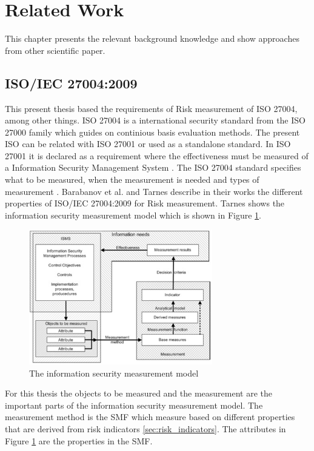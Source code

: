 \section{Related Work}
\label{sec:relWork}

This chapter presents the relevant background knowledge and show approaches from other scientific paper.

\subsection{ISO/IEC 27004:2009}

This present thesis based the requirements of Risk measurement of ISO 27004, among other things. ISO 27004 is a international security standard from the ISO 27000 \cite{DBLP:conf/euspn/MeriahR19} family which guides on continious basis evaluation methods. The present ISO can be related with ISO 27001 or used as a standalone standard. In ISO 27001 it is declared as a requirement where the effectiveness must be measured of a Information Security Management System \cite{barabanov2011information}. The ISO 27004 standard specifies what to be measured, when the measurement is needed and types of measurement \cite{lundholm2011design}. Barabanov et al. \cite{barabanov2011information} and Tarnes \cite{tarnes2012information} describe in their works the different properties of ISO/IEC 27004:2009 for Risk measurement. Tarnes shows the information security measurement model which is shown in Figure \ref{fig:is_measurement_model}.

\begin{figure}[h!]
  \centering
  \includegraphics[width=8cm]{pictures/is_measurement_model.jpg}
  \caption{The information security measurement model \cite{tarnes2012information}}
  \label{fig:is_measurement_model}
\end{figure}

For this thesis the objects to be measured and the measurement are the important parts of the information security measurement model. The measurement method is the SMF which measure based on different properties that are derived from risk indicators \ref{sec:risk_indicators}. The attributes in Figure \ref{fig:is_measurement_model} are the properties in the SMF.

